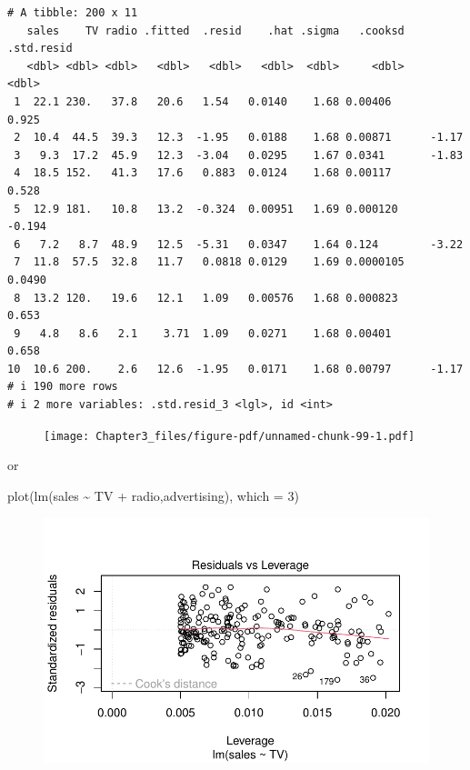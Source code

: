 \documentclass[
  letterpaper,
  DIV=11,
  numbers=noendperiod]{scrreprt}
\newenvironment{Shaded}{\begin{snugshade}}{\end{snugshade}}
\newcommand{\AttributeTok}[1]{\textcolor[rgb]{0.65,0.35,0.00}{#1}}
\newcommand{\DecValTok}[1]{\textcolor[rgb]{0.47,0.16,0.63}{#1}}
\newcommand{\FunctionTok}[1]{\textcolor[rgb]{0.02,0.16,0.49}{#1}}
\newcommand{\NormalTok}[1]{\textcolor[rgb]{0.33,0.33,0.33}{#1}}
\newcommand{\SpecialCharTok}[1]{\textcolor[rgb]{0.00,0.46,0.62}{#1}}
\begin{document}
\begin{verbatim}
# A tibble: 200 x 11
   sales    TV radio .fitted  .resid    .hat .sigma   .cooksd .std.resid
   <dbl> <dbl> <dbl>   <dbl>   <dbl>   <dbl>  <dbl>     <dbl>      <dbl>
 1  22.1 230.   37.8   20.6   1.54   0.0140    1.68 0.00406       0.925 
 2  10.4  44.5  39.3   12.3  -1.95   0.0188    1.68 0.00871      -1.17  
 3   9.3  17.2  45.9   12.3  -3.04   0.0295    1.67 0.0341       -1.83  
 4  18.5 152.   41.3   17.6   0.883  0.0124    1.68 0.00117       0.528 
 5  12.9 181.   10.8   13.2  -0.324  0.00951   1.69 0.000120     -0.194 
 6   7.2   8.7  48.9   12.5  -5.31   0.0347    1.64 0.124        -3.22  
 7  11.8  57.5  32.8   11.7   0.0818 0.0129    1.69 0.0000105     0.0490
 8  13.2 120.   19.6   12.1   1.09   0.00576   1.68 0.000823      0.653 
 9   4.8   8.6   2.1    3.71  1.09   0.0271    1.68 0.00401       0.658 
10  10.6 200.    2.6   12.6  -1.95   0.0171    1.68 0.00797      -1.17  
# i 190 more rows
# i 2 more variables: .std.resid_3 <lgl>, id <int>
\end{verbatim}

\begin{figure}[H]

{\centering \texttt{[image: Chapter3\_files/figure-pdf/unnamed-chunk-99-1.pdf]}

}

\end{figure}

or

\begin{Shaded}
\begin{Highlighting}[]
\FunctionTok{plot}\NormalTok{(}\FunctionTok{lm}\NormalTok{(sales }\SpecialCharTok{\textasciitilde{}}\NormalTok{ TV }\SpecialCharTok{+}\NormalTok{ radio,advertising), }\AttributeTok{which =} \DecValTok{3}\NormalTok{)}
\end{Highlighting}
\end{Shaded}

\begin{figure}[H]

{\centering \includegraphics{Chapter3_files/figure-pdf/unnamed-chunk-100-1.pdf}

}

\end{figure}
\end{document}
